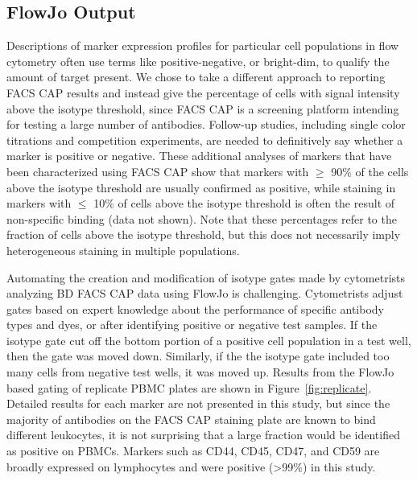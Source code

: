 \documentclass[12pt]{article}
\begin{document}
\subsection*{FlowJo Output}

Descriptions of marker expression profiles for particular cell populations in
flow cytometry often use terms like positive-negative, or bright-dim, to
qualify the amount of target present. We chose to take a different approach
to reporting FACS CAP results and instead give the percentage of cells with
signal intensity above the isotype threshold, since FACS CAP is a screening
platform intending for testing a large number of antibodies. Follow-up studies,
including single color titrations and competition experiments, are needed to
definitively say whether a marker is positive or negative. These additional
analyses of markers that have been characterized using FACS CAP show that
markers with $\ge$ 90\% of the cells above the isotype threshold are usually
confirmed as positive, while staining in markers with $\le$ 10\% of cells above
the isotype threshold is often the result of non-specific binding (data not
shown). Note that these percentages refer to the fraction of cells above the
isotype threshold, but this does not necessarily imply heterogeneous staining in
multiple populations.

Automating the creation and modification of isotype gates made by cytometrists
analyzing BD FACS CAP data using FlowJo is challenging. Cytometrists adjust
gates based on expert knowledge about the performance of specific antibody
types and dyes, or after identifying positive or negative test samples. If the
isotype gate cut off the bottom portion of a positive cell population in a test
well, then the gate was moved down.  Similarly, if the the isotype gate
included too many cells from negative test wells, it was moved up. Results from
the FlowJo based gating of replicate PBMC plates are shown in
Figure~\ref{fig:replicate}. Detailed results for each marker are not
presented in this study, but since the majority of antibodies on the FACS
CAP staining plate are known to bind different leukocytes, it is not surprising
that a large fraction would be identified as positive on PBMCs. Markers such as
CD44, CD45, CD47, and CD59 are broadly expressed on lymphocytes and were
positive (>99\%) in this study.

\end{document}
